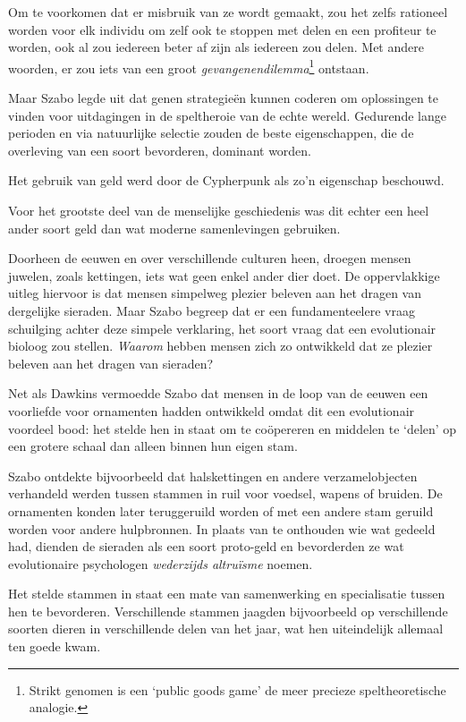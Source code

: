 \documentclass[smalldemyvopaper,11pt,twoside,onecolumn,openright,extrafontsizes,hidelinks]{memoir}
\begin{document}
Om te voorkomen dat er misbruik van ze wordt gemaakt, zou het zelfs
rationeel worden voor elk individu om zelf ook te stoppen met delen en
een profiteur te worden, ook al zou iedereen beter af zijn als iedereen
zou delen. Met andere woorden, er zou iets van een groot
\emph{gevangenendilemma}\footnote{Strikt genomen is een `public goods
  game' de meer precieze speltheoretische analogie.} ontstaan.

Maar Szabo legde uit dat genen strategieën kunnen coderen om oplossingen
te vinden voor uitdagingen in de speltheroie van de echte wereld.
Gedurende lange perioden en via natuurlijke selectie zouden de beste
eigenschappen, die de overleving van een soort bevorderen, dominant
worden.

Het gebruik van geld werd door de Cypherpunk als zo'n eigenschap
beschouwd.

Voor het grootste deel van de menselijke geschiedenis was dit echter een
heel ander soort geld dan wat moderne samenlevingen gebruiken.

Doorheen de eeuwen en over verschillende culturen heen, droegen mensen
juwelen, zoals kettingen, iets wat geen enkel ander dier doet. De
oppervlakkige uitleg hiervoor is dat mensen simpelweg plezier beleven
aan het dragen van dergelijke sieraden. Maar Szabo begreep dat er een
fundamenteelere vraag schuilging achter deze simpele verklaring, het
soort vraag dat een evolutionair bioloog zou stellen. \emph{Waarom}
hebben mensen zich zo ontwikkeld dat ze plezier beleven aan het dragen
van sieraden?

Net als Dawkins vermoedde Szabo dat mensen in de loop van de eeuwen een
voorliefde voor ornamenten hadden ontwikkeld omdat dit een evolutionair
voordeel bood: het stelde hen in staat om te coöpereren en middelen te
`delen' op een grotere schaal dan alleen binnen hun eigen stam.

Szabo ontdekte bijvoorbeeld dat halskettingen en andere verzamelobjecten
verhandeld werden tussen stammen in ruil voor voedsel, wapens of
bruiden. De ornamenten konden later teruggeruild worden of met een
andere stam geruild worden voor andere hulpbronnen. In plaats van te
onthouden wie wat gedeeld had, dienden de sieraden als een soort
proto-geld en bevorderden ze wat evolutionaire psychologen
\emph{wederzijds altruïsme} noemen.

Het stelde stammen in staat een mate van samenwerking en specialisatie
tussen hen te bevorderen. Verschillende stammen jaagden bijvoorbeeld op
verschillende soorten dieren in verschillende delen van het jaar, wat
hen uiteindelijk allemaal ten goede kwam.
\end{document}
